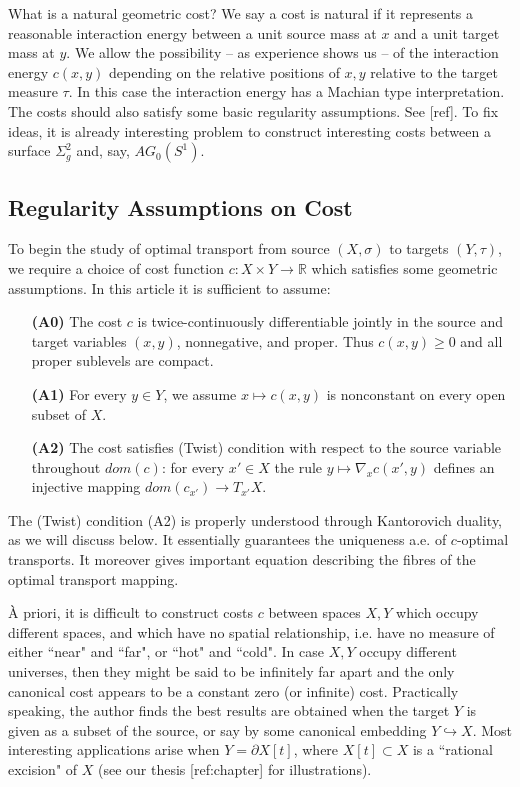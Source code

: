 \documentclass[12pt]{amsart}
\theoremstyle{remark}
\newcommand{\bR}{\mathbb{R}}
\newcommand{\del}{\partial}
\begin{document}
What is a natural geometric cost? We say a cost is natural if it represents a reasonable interaction energy between a unit source mass at $x$ and a unit target mass at $y$. We allow the possibility -- as experience shows us -- of the interaction energy $c(x,y)$ depending on the relative positions of $x,y$ relative to the target measure $\tau$. In this case the interaction energy has a Machian type interpretation. The costs should also satisfy some basic regularity assumptions. See [ref]. To fix ideas, it is already interesting problem to construct interesting costs between a surface $\Sigma_g^2$ and, say, $AG_0(S^1)$.





\subsection{Regularity Assumptions on Cost}
To begin the study of optimal transport from source $(X,\sigma)$ to targets $(Y,\tau)$, we require a choice of cost function $c: X\times Y \to \bR$ which satisfies some geometric assumptions. In this article it is sufficient to assume:

\begin{itemize}
\item[\textbf{(A0)}] The cost $c$ is twice-continuously differentiable jointly in the source and target variables $(x,y)$, nonnegative, and proper. Thus $c(x,y)\geq 0$ and all proper sublevels are compact.

\item[\textbf{(A1)}] For every $y\in Y$, we assume $x\mapsto c(x,y)$ is nonconstant on every open subset of $X$.

\item[\textbf{(A2)}] The cost satisfies (Twist) condition with respect to the source variable throughout $dom(c)$: for every $x'\in X$ the rule $y\mapsto \nabla_x c(x',y)$ defines an injective mapping $dom(c_{x'}) \to T_{x'} X$. 
\end{itemize}

The (Twist) condition (A2) is properly understood through Kantorovich duality, as we will discuss below. It essentially guarantees the uniqueness a.e. of $c$-optimal transports. It moreover gives important equation describing the fibres of the optimal transport mapping.

\`A priori, it is difficult to construct costs $c$ between spaces $X, Y$ which occupy different spaces, and which have no spatial relationship, i.e. have no measure of either ``near" and ``far", or ``hot" and ``cold". In case $X,Y$ occupy different universes, then they might be said to be infinitely far apart and the only canonical cost appears to be a constant zero (or infinite) cost. Practically speaking, the author finds the best results are obtained when the target $Y$ is given as a subset of the source, or say by some canonical embedding $Y\hookrightarrow X$. Most interesting applications arise when $Y=\del X[t]$, where $X[t] \subset X$ is a ``rational excision" of $X$ (see our thesis [ref:chapter] for illustrations). 
\end{document}

